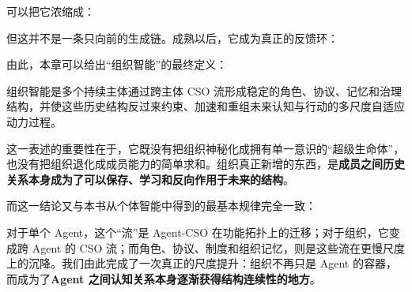 可以把它浓缩成：
\begin{statementbox}
\centering
{}
\end{statementbox}

但这并不是一条只向前的生成链。成熟以后，它成为真正的反馈环：
\begin{statementbox}
\centering
{}
\end{statementbox}

由此，本章可以给出“组织智能”的最终定义：

\begin{definition*}
组织智能是多个持续主体通过跨主体 CSO 流形成稳定的角色、协议、记忆和治理结构，并使这些历史结构反过来约束、加速和重组未来认知与行动的多尺度自适应动力过程。
\end{definition*}

这一表述的重要性在于，它既没有把组织神秘化成拥有单一意识的“超级生命体”，也没有把组织退化成成员能力的简单求和。组织真正新增的东西，是\textbf{成员之间历史关系本身成为了可以保存、学习和反向作用于未来的结构}。

而这一结论又与本书从个体智能中得到的最基本规律完全一致：

\begin{statementbox}
\centering
{}
\end{statementbox}

对于单个 Agent，这个“流”是 Agent-CSO 在功能拓扑上的迁移；对于组织，它变成跨 Agent 的 CSO 流；而角色、协议、制度和组织记忆，则是这些流在更慢尺度上的沉降。我们由此完成了一次真正的尺度提升：组织不再只是 Agent 的容器，而成为了\textbf{Agent 之间认知关系本身逐渐获得结构连续性的地方}。
